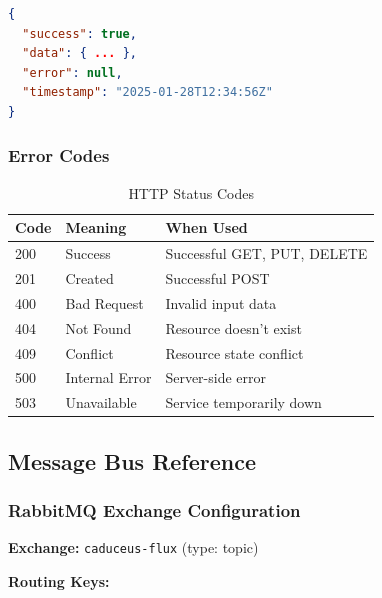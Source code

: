 \documentclass[10pt,a4paper]{article}
\begin{document}
\begin{lstlisting}[language=json]
{
  "success": true,
  "data": { ... },
  "error": null,
  "timestamp": "2025-01-28T12:34:56Z"
}
\end{lstlisting}

\subsubsection{Error Codes}

\begin{table}[htbp]
\centering
\caption{HTTP Status Codes}
\begin{tabularx}{\textwidth}{lXX}
\toprule
\textbf{Code} & \textbf{Meaning} & \textbf{When Used} \\
\midrule
200 & Success & Successful GET, PUT, DELETE \\
201 & Created & Successful POST \\
400 & Bad Request & Invalid input data \\
404 & Not Found & Resource doesn't exist \\
409 & Conflict & Resource state conflict \\
500 & Internal Error & Server-side error \\
503 & Unavailable & Service temporarily down \\
\bottomrule
\end{tabularx}
\end{table}

\subsection{Message Bus Reference}

\subsubsection{RabbitMQ Exchange Configuration}

\textbf{Exchange:} \texttt{caduceus-flux} (type: topic)

\textbf{Routing Keys:}
\end{document}
